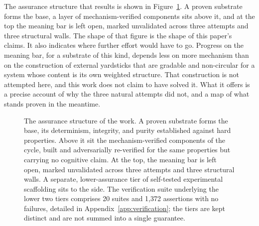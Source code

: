 \documentclass[11pt]{article}
\begin{document}
The assurance structure that results is shown in Figure~\ref{fig:tiermap}. A proven
substrate forms the base, a layer of mechanism-verified components sits above it, and at
the top the meaning bar is left open, marked unvalidated across three attempts and three
structural walls. The shape of that figure is the shape of this paper's claims. It also
indicates where further effort would have to go. Progress on the meaning bar, for a
substrate of this kind, depends less on more mechanism than on the construction of
external yardsticks that are gradable and non-circular for a system whose content is its
own weighted structure. That construction is not attempted here, and this work does not
claim to have solved it. What it offers is a precise account of why the three natural
attempts did not, and a map of what stands proven in the meantime.

\begin{figure}[t]
  \centering
  \caption{The assurance structure of the work. A proven substrate forms the base, its
    determinism, integrity, and purity established against hard properties. Above it sit
    the mechanism-verified components of the cycle, built and adversarially re-verified for
    the same properties but carrying no cognitive claim. At the top, the meaning bar is
    left open, marked unvalidated across three attempts and three structural walls. A
    separate, lower-assurance tier of self-tested experimental scaffolding sits to the
    side. The verification suite underlying the lower two tiers comprises 20 suites and
    1,372 assertions with no failures, detailed in Appendix~\ref{app:verification}; the
    tiers are kept distinct and are not summed into a single guarantee.}
  \label{fig:tiermap}
\end{figure}
\end{document}
